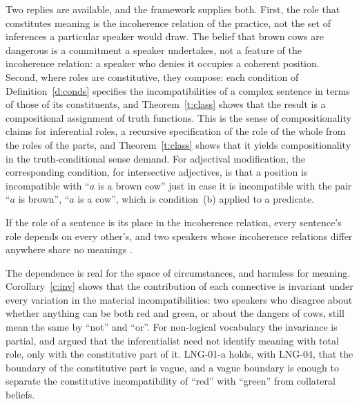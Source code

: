 \documentclass{situationist-preprint}
\begin{document}
\begin{reply}
Two replies are available, and the framework supplies both. First, the role that constitutes meaning is the incoherence relation of the practice, not the set of inferences a particular speaker would draw. The belief that brown cows are dangerous is a commitment a speaker undertakes, not a feature of the incoherence relation: a speaker who denies it occupies a coherent position. Second, where roles are constitutive, they compose: each condition of Definition~\ref{d:conds} specifies the incompatibilities of a complex sentence in terms of those of its constituents, and Theorem~\ref{t:class} shows that the result is a compositional assignment of truth functions. This is the sense of compositionality \citet{Brandom2007} claims for inferential roles, a recursive specification of the role of the whole from the roles of the parts, and Theorem~\ref{t:class} shows that it yields compositionality in the truth-conditional sense \citet{FodorLepore2007} demand. For adjectival modification, the corresponding condition, for intersective adjectives, is that a position is incompatible with \enquote{$a$ is a brown cow} just in case it is incompatible with the pair \enquote{$a$ is brown}, \enquote{$a$ is a cow}, which is condition~(b) applied to a predicate.
\end{reply}

\begin{objection}[Holism]\label{o:hol}
If the role of a sentence is its place in the incoherence relation, every sentence's role depends on every other's, and two speakers whose incoherence relations differ anywhere share no meanings \citep{FodorLepore1992}.
\end{objection}

\begin{reply}
The dependence is real for the space of circumstances, and harmless for meaning. Corollary~\ref{c:inv} shows that the contribution of each connective is invariant under every variation in the material incompatibilities: two speakers who disagree about whether anything can be both red and green, or about the dangers of cows, still mean the same by \enquote{not} and \enquote{or}. For non-logical vocabulary the invariance is partial, and \citet{Boghossian1993} argued that the inferentialist need not identify meaning with total role, only with the constitutive part of it. LNG-01-a holds, with LNG-04, that the boundary of the constitutive part is vague, and a vague boundary is enough to separate the constitutive incompatibility of \enquote{red} with \enquote{green} from collateral beliefs.
\end{reply}
\end{document}
